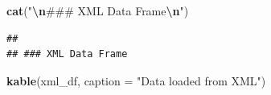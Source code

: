 \documentclass[
]{article}
\newenvironment{Shaded}{\begin{snugshade}}{\end{snugshade}}
\newcommand{\AttributeTok}[1]{\textcolor[rgb]{0.13,0.29,0.53}{#1}}
\newcommand{\FunctionTok}[1]{\textcolor[rgb]{0.13,0.29,0.53}{\textbf{#1}}}
\newcommand{\NormalTok}[1]{#1}
\newcommand{\SpecialCharTok}[1]{\textcolor[rgb]{0.81,0.36,0.00}{\textbf{#1}}}
\newcommand{\StringTok}[1]{\textcolor[rgb]{0.31,0.60,0.02}{#1}}
\begin{document}
\begin{Shaded}
\begin{Highlighting}[]
\FunctionTok{cat}\NormalTok{(}\StringTok{"}\SpecialCharTok{\textbackslash{}n}\StringTok{\#\#\# XML Data Frame}\SpecialCharTok{\textbackslash{}n}\StringTok{"}\NormalTok{)}
\end{Highlighting}
\end{Shaded}

\begin{verbatim}
## 
## ### XML Data Frame
\end{verbatim}

\begin{Shaded}
\begin{Highlighting}[]
\FunctionTok{kable}\NormalTok{(xml\_df, }\AttributeTok{caption =} \StringTok{"Data loaded from XML"}\NormalTok{)}
\end{Highlighting}
\end{Shaded}
\end{document}
